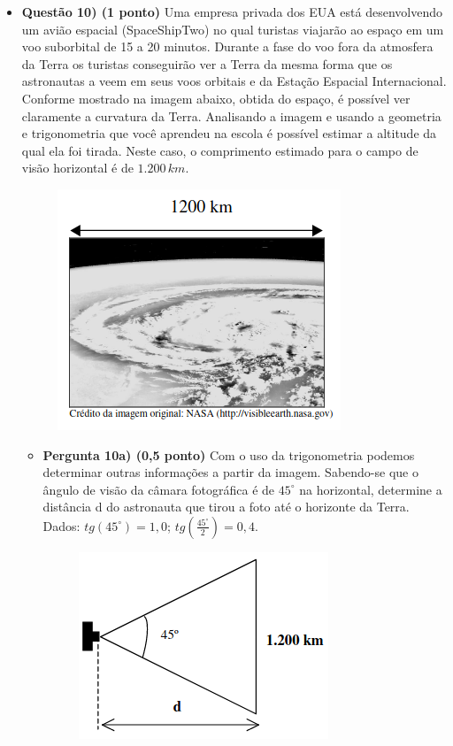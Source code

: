\documentclass[a4paper, 12pt]{article}
\begin{document}
\begin{flushleft}
\begin{itemize}
        \item \textbf{Questão 10) (1 ponto)} Uma empresa privada dos EUA está desenvolvendo um avião espacial (SpaceShipTwo) no qual turistas viajarão ao espaço em um voo suborbital de 15 a 20 minutos. Durante a fase do voo fora da atmosfera da Terra os turistas conseguirão ver a Terra da mesma forma que os astronautas a veem em seus voos orbitais e da Estação Espacial Internacional. Conforme mostrado na imagem abaixo, obtida do espaço, é possível ver claramente a curvatura da Terra. Analisando a imagem e usando a geometria e trigonometria que você aprendeu na escola é possível estimar a altitude da qual ela foi tirada. Neste caso, o comprimento estimado para o campo de visão horizontal é de $1.200 \, km$.
            \begin{figure}[H]
                \centering
                \includegraphics[scale=0.5]{img/10.png}
            \end{figure}
            \begin{itemize}
                \item \textbf{Pergunta 10a) (0,5 ponto)} Com o uso da trigonometria podemos determinar outras informações a partir da imagem. Sabendo-se que o ângulo de visão da câmara fotográfica é de $45^{\circ}$ na horizontal, determine a distância d do astronauta que tirou a foto até o horizonte da Terra. Dados: $tg(45^{\circ}) = 1,0$; $tg \left(\frac{45^{\circ}}{2}\right) = 0,4$.
                    \begin{figure}[H]
                        \centering
                        \includegraphics[scale=0.5]{img/10a.png}

\end{figure}
\end{itemize}
\end{itemize}
\end{flushleft}
\end{document}
